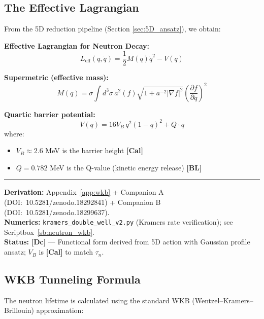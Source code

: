 \documentclass[11pt,a4paper]{article}
\newcommand{\tagDc}{\textcolor{blue!70!black}{\textbf{[Dc]}}}
\newcommand{\tagCal}{\textcolor{purple!70!black}{\textbf{[Cal]}}}
\newcommand{\tagBL}{\textcolor{gray!70!black}{\textbf{[BL]}}}
\begin{document}
\subsection{The Effective Lagrangian}

From the 5D reduction pipeline (Section \ref{sec:5D_ansatz}), we obtain:

\begin{resultbox}
\textbf{Effective Lagrangian for Neutron Decay:}
\begin{equation}
    L_{\text{eff}}(q, \dot{q}) = \frac{1}{2} M(q) \dot{q}^2 - V(q)
    \label{eq:L_eff_neutron}
\end{equation}

\textbf{Supermetric (effective mass):}
\begin{equation}
    M(q) = \sigma \int d^3\sigma \, a^2(f) \sqrt{1 + a^{-2}|\nabla f|^2} \left( \frac{\partial f}{\partial q} \right)^2
    \label{eq:supermetric}
\end{equation}

\textbf{Quartic barrier potential:}
\begin{equation}
    V(q) = 16 V_B \, q^2 (1-q)^2 + Q \cdot q
    \label{eq:quartic_potential}
\end{equation}
where:
\begin{itemize}[nosep]
    \item $V_B \approx 2.6$ MeV is the barrier height \tagCal{}
    \item $Q = 0.782$ MeV is the Q-value (kinetic energy release) \tagBL{}
\end{itemize}

\vspace{0.3em}\hrule\vspace{0.3em}
\textbf{Derivation:} Appendix~\ref{app:wkb} + Companion A (DOI:~10.5281/zenodo.18292841) + Companion B (DOI:~10.5281/zenodo.18299637).\\
\textbf{Numerics:} \texttt{kramers\_double\_well\_v2.py} (Kramers rate verification); see Scriptbox~\ref{sb:neutron_wkb}.\\
\textbf{Status:} \tagDc{} --- Functional form derived from 5D action with Gaussian profile ansatz; $V_B$ is \tagCal{} to match $\tau_n$.
\end{resultbox}

\subsection{WKB Tunneling Formula}

The neutron lifetime is calculated using the standard WKB (Wentzel--Kramers--Brillouin) approximation:
\end{document}
